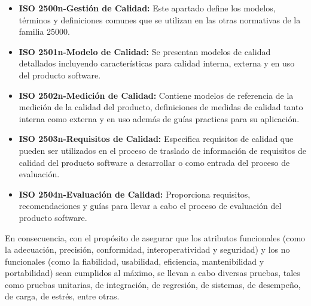 \begin{itemize}[topsep=0pt]  
    \addtolength\itemsep{-4mm}
    \item \textbf{ISO 2500n-Gestión de Calidad:} Este apartado define los modelos, términos y definiciones comunes que se utilizan en las otras normativas de la familia 25000.
    \item \textbf{ISO 2501n-Modelo de Calidad:} Se presentan modelos de calidad detallados incluyendo características para calidad interna, externa y en uso del producto software.
    \item \textbf{ISO 2502n-Medición de Calidad:}  Contiene modelos de referencia de la medición de la calidad del producto, definiciones de medidas de calidad tanto interna como externa y en uso además
    de guías practicas para su aplicación.
    \item \textbf{ISO 2503n-Requisitos de Calidad:} Especifica requisitos de calidad que pueden ser utilizados en el proceso de traslado de información de requisitos de calidad del producto software a desarrollar o como entrada del proceso de evaluación.
    \item \textbf{ISO 2504n-Evaluación de Calidad:} Proporciona requisitos, recomendaciones y guías para llevar a cabo el proceso de evaluación del producto software.
\end{itemize}

En consecuencia, con el propósito de asegurar que los atributos funcionales (como la adecuación, precisión, conformidad, interoperatividad y seguridad) y los no funcionales (como la fiabilidad, usabilidad, eficiencia, mantenibilidad y portabilidad) sean cumplidos al máximo, se llevan a cabo diversas pruebas, tales como pruebas unitarias, de integración, de regresión, de sistemas, de desempeño, de carga, de estrés, entre otras.

